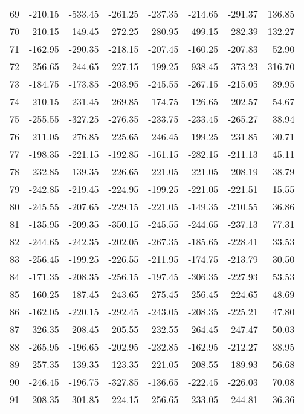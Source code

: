\begin{longtable}{rrrrrrrr}
69 & -210.15 & -533.45 & -261.25 & -237.35 & -214.65 & -291.37 & 136.85  \\
70 & -210.15 & -149.45 & -272.25 & -280.95 & -499.15 & -282.39 & 132.27  \\
71 & -162.95 & -290.35 & -218.15 & -207.45 & -160.25 & -207.83 & 52.90  \\
72 & -256.65 & -244.65 & -227.15 & -199.25 & -938.45 & -373.23 & 316.70  \\
73 & -184.75 & -173.85 & -203.95 & -245.55 & -267.15 & -215.05 & 39.95  \\
74 & -210.15 & -231.45 & -269.85 & -174.75 & -126.65 & -202.57 & 54.67  \\
75 & -255.55 & -327.25 & -276.35 & -233.75 & -233.45 & -265.27 & 38.94  \\
76 & -211.05 & -276.85 & -225.65 & -246.45 & -199.25 & -231.85 & 30.71  \\
77 & -198.35 & -221.15 & -192.85 & -161.15 & -282.15 & -211.13 & 45.11  \\
78 & -232.85 & -139.35 & -226.65 & -221.05 & -221.05 & -208.19 & 38.79  \\
79 & -242.85 & -219.45 & -224.95 & -199.25 & -221.05 & -221.51 & 15.55  \\
80 & -245.55 & -207.65 & -229.15 & -221.05 & -149.35 & -210.55 & 36.86  \\
81 & -135.95 & -209.35 & -350.15 & -245.55 & -244.65 & -237.13 & 77.31  \\
82 & -244.65 & -242.35 & -202.05 & -267.35 & -185.65 & -228.41 & 33.53  \\
83 & -256.45 & -199.25 & -226.55 & -211.95 & -174.75 & -213.79 & 30.50  \\
84 & -171.35 & -208.35 & -256.15 & -197.45 & -306.35 & -227.93 & 53.53  \\
85 & -160.25 & -187.45 & -243.65 & -275.45 & -256.45 & -224.65 & 48.69  \\
86 & -162.05 & -220.15 & -292.45 & -243.05 & -208.35 & -225.21 & 47.80  \\
87 & -326.35 & -208.45 & -205.55 & -232.55 & -264.45 & -247.47 & 50.03  \\
88 & -265.95 & -196.65 & -202.95 & -232.85 & -162.95 & -212.27 & 38.95  \\
89 & -257.35 & -139.35 & -123.35 & -221.05 & -208.55 & -189.93 & 56.68  \\
90 & -246.45 & -196.75 & -327.85 & -136.65 & -222.45 & -226.03 & 70.08  \\
91 & -208.35 & -301.85 & -224.15 & -256.65 & -233.05 & -244.81 & 36.36  \\

\end{longtable}
